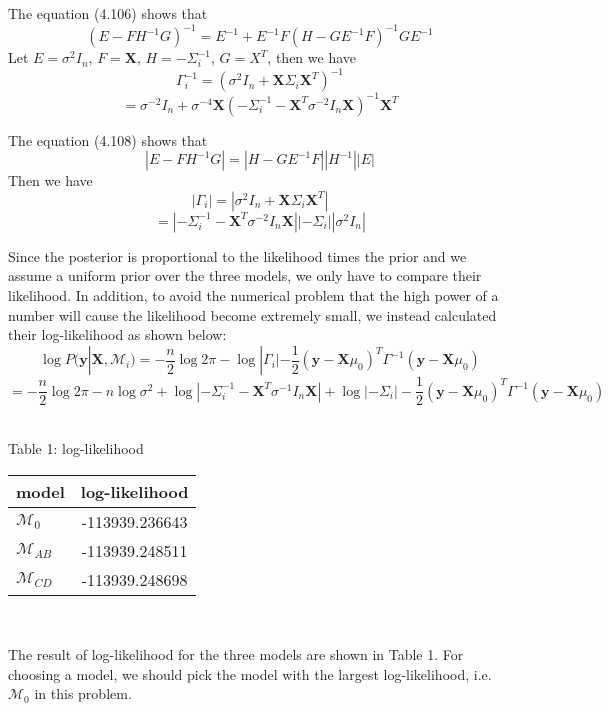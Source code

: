 \documentclass{article}
\begin{document}
\noindent
The equation (4.106) shows that\\
$$(E - FH^{-1}G)^{-1} = E^{-1} + E^{-1}F(H - GE^{-1}F)^{-1}GE^{-1}$$
Let $E = \sigma^2I_n$, $F = \textbf{X}$, $H = -\Sigma_i^{-1}$, $G = X^T$, then we have
$$\Gamma_i^{-1} = (\sigma^2I_n + \textbf{X}\Sigma_i\textbf{X}^T)^{-1}$$
$$= \sigma^{-2}I_n + \sigma^{-4}\textbf{X}(-\Sigma_i^{-1} - \textbf{X}^T\sigma^{-2}I_n\textbf{X})^{-1}\textbf{X}^T$$

\noindent
The equation (4.108) shows that\\
$$|E - FH^{-1}G| = |H - GE^{-1}F||H^{-1}||E|$$
Then we have
$$|\Gamma_i| = |\sigma^2I_n + \textbf{X}\Sigma_i\textbf{X}^T|$$
$$=|-\Sigma_i^{-1} - \textbf{X}^T\sigma^{-2}I_n\textbf{X}||-\Sigma_i||\sigma^2I_n|$$

\noindent
Since the posterior is proportional to the likelihood times the prior and we assume a uniform prior over the three models, we only have to compare their likelihood. In addition, to avoid the numerical problem that the high power of a number will cause the likelihood become extremely small, we instead calculated their log-likelihood as shown below:\\
$$\log P(\textbf{y}|\textbf{X}, \mathcal{M}_i) = -\frac{n}{2} \log2\pi - \log|\Gamma_i| - \frac{1}{2}(\textbf{y} - \textbf{X}\mu_0)^T \Gamma^{-1} (\textbf{y} - \textbf{X}\mu_0)$$
$$=-\frac{n}{2} \log2\pi - n\log\sigma^2 + \log|-\Sigma_i^{-1} - \textbf{X}^T\sigma^{-1}I_n\textbf{X}| + \log|-\Sigma_i| - \frac{1}{2}(\textbf{y} - \textbf{X}\mu_0)^T \Gamma^{-1} (\textbf{y} - \textbf{X}\mu_0)$$\\

\noindent
\begin{center}
Table 1: log-likelihood\\
\begin{tabular}{ l c }
  model & log-likelihood \\
  \hline
  $\mathcal{M}_0$    & -113939.236643  \\
  $\mathcal{M}_{AB}$ & -113939.248511  \\
  $\mathcal{M}_{CD}$ & -113939.248698
\end{tabular}\\
\end{center}

\noindent
The result of log-likelihood for the three models are shown in Table 1. For choosing a model, we should pick the model with the largest log-likelihood, i.e. $\mathcal{M}_0$ in this problem.\\
\end{document}
